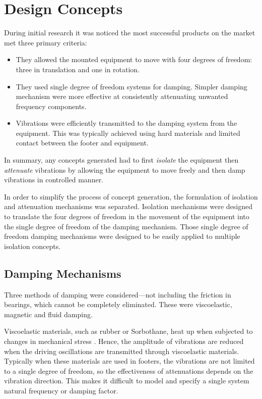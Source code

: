 \documentclass{article}
\begin{document}
    
\section{Design Concepts}

During initial research it was noticed the most successful products on the 
market met three primary criteria:

\begin{itemize}
    \item They allowed the mounted equipment to move with four degrees of 
    freedom: three in translation and one in rotation.
    \item They used single degree of freedom systems for damping. Simpler 
    damping mechanism were more effective at consistently attenuating 
    unwanted frequency components.
    \item Vibrations were efficiently transmitted to the damping system from 
    the equipment. This was typically achieved using hard materials and limited 
    contact between the footer and equipment.
\end{itemize}

In summary, any concepts generated had to first \emph{isolate} the equipment 
then \emph{attenuate} vibrations by allowing the equipment to move freely and 
then damp vibrations in controlled manner.

In order to simplify the process of concept generation, the formulation of 
isolation and attenuation mechanisms was separated. Isolation mechanisms were 
designed to translate the four degrees of freedom in the movement of the 
equipment into the single degree of freedom of the damping mechanism. Those 
single degree of freedom damping mechanisms were designed to be easily applied 
to multiple isolation concepts.

\subsection{Damping Mechanisms} \label{sec:damping_mechanisms}

Three methods of damping were considered---not including the friction in 
bearings, which cannot be completely eliminated. These were viscoelastic, 
magnetic and fluid damping.

Viscoelastic materials, such as rubber or Sorbothane\textregistered, heat up 
when subjected to changes in mechanical stress \cite{meyers2009mechanical}. 
Hence, the amplitude of vibrations are reduced when the driving oscillations 
are transmitted through viscoelastic materials. Typically when these materials 
are used in footers, the vibrations are not limited to a single degree of 
freedom, so the effectiveness of attenuations depends on the vibration 
direction. This makes it difficult to model and specify a single system natural 
frequency or damping factor.
\end{document}
